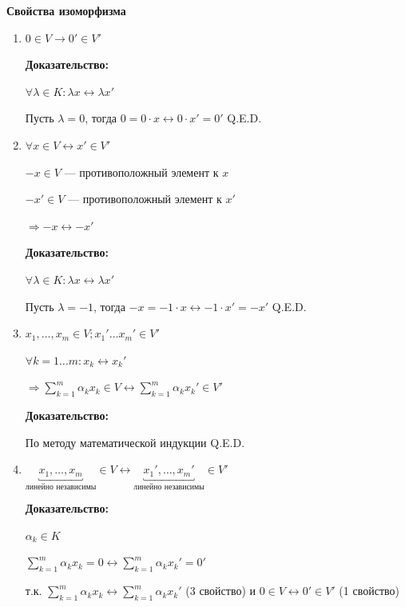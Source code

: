 \documentclass[twoside]{book}
\begin{document}
\textbf{Свойства изоморфизма}

\begin{enumerate}
    \item \(0 \in V \longrightarrow 0' \in V'\)

          \textbf{Доказательство:}

          \(\forall \lambda \in K: \lambda x \longleftrightarrow \lambda x'\)

          Пусть \(\lambda = 0\), тогда \(0 = 0 \cdot x \longleftrightarrow 0 \cdot x' = 0'\)
          \hfill Q.E.D.

    \item \(\forall x \in V \longleftrightarrow x' \in V'\)

          \(-x \in V\) --- противоположный элемент к \(x\)

          \(-x' \in V\) --- противоположный элемент к \(x'\)

          \(\Rightarrow -x \longleftrightarrow -x'\)

          \textbf{Доказательство:}

          \(\forall \lambda \in K: \lambda x \longleftrightarrow \lambda x'\)

          Пусть \(\lambda = -1\), тогда \(-x = -1 \cdot x \longleftrightarrow -1 \cdot x' = -x'\)
          \hfill Q.E.D.

    \item
          \(x_1, \ldots, x_m \in V; x_1' \ldots x_m' \in V'\)

          \(\forall k = 1 \ldots m: x_k \longleftrightarrow x_k'\)

          \(\Rightarrow \sum\limits_{k = 1}^{m} \alpha_k x_k \in V \longleftrightarrow \sum\limits_{k = 1}^{m} \alpha_k x_k' \in V'\)

          \textbf{Доказательство:}

          По методу математической индукции
          \hfill Q.E.D.

    \item \(\underbracket{x_1, \ldots
              , x_m}_{\text{линейно независимы}} \in V \longleftrightarrow \underbracket{x_1', \ldots, x_m'}_{\text{линейно независимы}} \in V'\)

          \textbf{Доказательство:}

          \(\alpha_k \in K\)

          \(\sum\limits_{k = 1}^{m} \alpha_k x_k = 0 \longleftrightarrow \sum\limits_{k = 1}^{m} \alpha_k x_k' = 0'\)

          т.к. \(\sum\limits_{k = 1}^{m} \alpha_k x_k \longleftrightarrow \sum\limits_{k = 1}^{m} \alpha_k x_k'\) (3 свойство) и \(0 \in V \longleftrightarrow 0' \in V'\) (1 свойство)


\end{enumerate}
\end{document}
